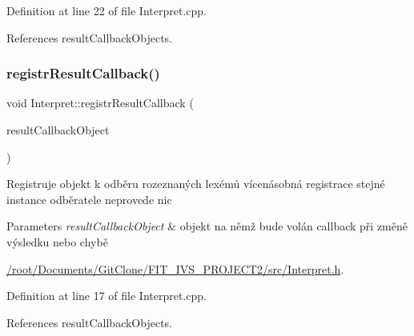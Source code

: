 Definition at line 22 of file Interpret.\+cpp.



References result\+Callback\+Objects.

\mbox{\label{classteam22_1_1_calc_1_1_interpret_a23e1e307b4f7ffd42f8eb31d33314c41}} 
\subsubsection{\texorpdfstring{registr\+Result\+Callback()}{registrResultCallback()}}
{\footnotesize\ttfamily void Interpret\+::registr\+Result\+Callback (\begin{DoxyParamCaption}\item[{\hyperlink{classteam22_1_1_calc_1_1_result_observer}{Result\+Observer} $\ast$}]{result\+Callback\+Object }\end{DoxyParamCaption})}

Registruje objekt k odběru rozeznaných lexémů vícenásobná registrace stejné instance odběratele neprovede nic


\begin{DoxyParams}{Parameters}
{\em result\+Callback\+Object} & objekt na němž bude volán callback při změně výsledku nebo chybě \\
\hline
\end{DoxyParams}
\begin{Desc}
\item[Examples\+: ]\par
\hyperlink{_2root_2_documents_2_git_clone_2_f_i_t__i_v_s__p_r_o_j_e_c_t2_2src_2_interpret_8h-example}{/root/\+Documents/\+Git\+Clone/\+F\+I\+T\+\_\+\+I\+V\+S\+\_\+\+P\+R\+O\+J\+E\+C\+T2/src/\+Interpret.\+h}.\end{Desc}


Definition at line 17 of file Interpret.\+cpp.



References result\+Callback\+Objects.

\mbox{\label{classteam22_1_1_calc_1_1_interpret_a479c65c010f4ef1060049b684e5f7eb6}} 
